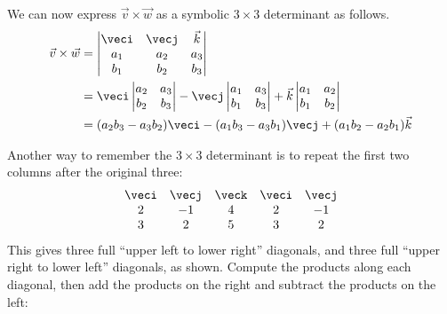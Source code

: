 We can now express $\vec{v} \times \vec{w}$ as a symbolic $3 \times 3$ determinant as follows.
\begin{align*}
\vec{v} \times \vec{w} & =
\begin{vmatrix}
\veci & \vecj & \vec{k} \\
a_1 & a_2 & a_3 \\
b_1 & b_2 & b_3 
\end{vmatrix} \\
& =
\veci \begin{vmatrix}a_2 & a_3 \\b_2 & b_3\end{vmatrix}
-\vecj \begin{vmatrix}a_1 & a_3 \\b_1 & b_3\end{vmatrix}
+\vec{k} \begin{vmatrix}a_1 & a_2 \\b_1 & b_2\end{vmatrix} \\
& = (a_2 b_3 - a_3 b_2) \veci
- (a_1 b_3 - a_3 b_1) \vecj
+ (a_1 b_2 - a_2 b_1) \vec{k}
\end{align*}



Another way to remember the $3\times3$ determinant is to
repeat the first two columns after the original three:
\[
 \begin{matrix}
  \veci&\vecj&\veck&\veci&\vecj \\
  2&-1&4&2&-1\\
  3&2&5&3&2
 \end{matrix}
\]
This gives three full ``upper left to lower right'' diagonals, and three full ``upper right to lower left'' diagonals, as shown. Compute the products along each diagonal, then add the products on the right and subtract the products on the left:

